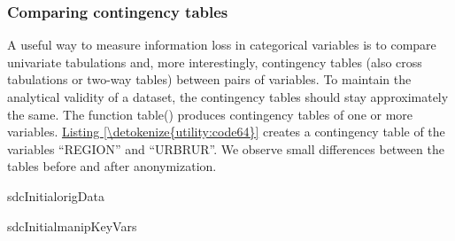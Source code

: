 \documentclass[letterpaper,10pt,english]{sphinxmanual}
\begin{document}
\subsubsection{Comparing contingency tables}
\label{\detokenize{utility:comparing-contingency-tables}}
A useful way to measure information loss in categorical variables is to
compare univariate tabulations and, more interestingly, contingency
tables (also cross tabulations or two-way tables) between pairs of
variables. To maintain the analytical validity of a dataset, the
contingency tables should stay approximately the same. The function
table() produces contingency tables of one or more variables. \hyperref[\detokenize{utility:code64}]{Listing \ref{\detokenize{utility:code64}}}
creates a contingency table of the variables “REGION” and “URBRUR”.
We observe small differences between the tables before and after
anonymization.

\def\sphinxLiteralBlockLabel{\label{\detokenize{utility:code64}}}
%
\begin{sphinxVerbatim}[commandchars=\\\{\},numbers=left,firstnumber=1,stepnumber=1]
 sdcInitialorigData\PYG{p}{[}  \PYG{p}{]} 

 sdcInitialmanipKeyVars\PYG{p}{[} \PYGZbs{}  \PYG{p}{]} 
\end{sphinxVerbatim}
\end{document}
